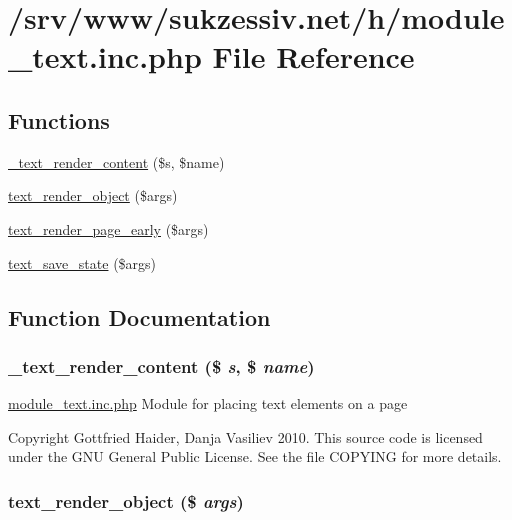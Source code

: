 \hypertarget{module__text_8inc_8php}{
\section{/srv/www/sukzessiv.net/h/module\_\-text.inc.php File Reference}
\label{module__text_8inc_8php}
}
\subsection*{Functions}
\begin{CompactItemize}
\item 
\hyperlink{module__text_8inc_8php_0586b5e177a15f5904d49b8b3aaf19ee}{\_\-text\_\-render\_\-content} (\$s, \$name)
\item 
\hyperlink{module__text_8inc_8php_8e9b1db22ff6cb0f3d20815da6aae6ce}{text\_\-render\_\-object} (\$args)
\item 
\hyperlink{module__text_8inc_8php_aaa8b8407d795f6dba9d258f1457ade8}{text\_\-render\_\-page\_\-early} (\$args)
\item 
\hyperlink{module__text_8inc_8php_7fa0ea2ee517914595d7eda355177289}{text\_\-save\_\-state} (\$args)
\end{CompactItemize}


\subsection{Function Documentation}
\hypertarget{module__text_8inc_8php_0586b5e177a15f5904d49b8b3aaf19ee}{
\subsubsection[{\_\-text\_\-render\_\-content}]{\setlength{\rightskip}{0pt plus 5cm}\_\-text\_\-render\_\-content (\$ {\em s}, \/  \$ {\em name})}}
\label{module__text_8inc_8php_0586b5e177a15f5904d49b8b3aaf19ee}


\hyperlink{module__text_8inc_8php}{module\_\-text.inc.php} Module for placing text elements on a page

Copyright Gottfried Haider, Danja Vasiliev 2010. This source code is licensed under the GNU General Public License. See the file COPYING for more details. \hypertarget{module__text_8inc_8php_8e9b1db22ff6cb0f3d20815da6aae6ce}{
\subsubsection[{text\_\-render\_\-object}]{\setlength{\rightskip}{0pt plus 5cm}text\_\-render\_\-object (\$ {\em args})}}
\label{module__text_8inc_8php_8e9b1db22ff6cb0f3d20815da6aae6ce}


